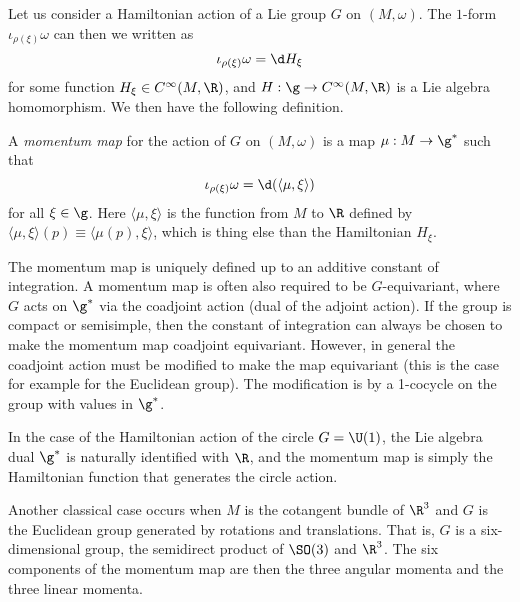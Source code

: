\documentclass{worksheetclass}
\begin{document}
        Let us consider a Hamiltonian action of a Lie group $G$ on $(M,\omega)$. The $1$-form $\iota_{\rho(\xi)}\omega$ can then we written as
        \begin{equation}
            \iota_{\rho(\xi)}\omega= \d H_{\xi}
        \end{equation}
        for some function $H_{\xi}\in C^\infty(M,\R)$, and $H:\g\to C^\infty(M,\R)$ is a Lie algebra homomorphism. We then have the following definition.
        \begin{defn}
            A \emph{momentum map} for the action of $G$ on $(M,\omega)$ is a map $\mu:M\to\g^*$ such that
            \begin{equation}
                \iota_{\rho(\xi)}\omega=\d(\langle \mu,\xi\rangle)
            \end{equation}
            for all $\xi\in\g$. Here $\langle \mu,\xi\rangle$ is the function from $M$ to $\R$ defined by $\langle \mu,\xi\rangle(p)\equiv\langle \mu(p),\xi\rangle$, which is thing else than the Hamiltonian $H_\xi$.
        \end{defn}
        The momentum map is uniquely defined up to an additive constant of integration. A momentum map is often also required to be $G$-equivariant, where $G$ acts on $\g^*$ via the coadjoint action (dual of the adjoint action). If the group is compact or semisimple, then the constant of integration can always be chosen to make the momentum map coadjoint equivariant. However, in general the coadjoint action must be modified to make the map equivariant (this is the case for example for the Euclidean group). The modification is by a 1-cocycle on the group with values in $\g^*$.

        \begin{examp}
            In the case of the Hamiltonian action of the circle $G=\U(1)$, the Lie algebra dual $\g^*$ is naturally identified with $\R$, and the momentum map is simply the Hamiltonian function that generates the circle action.
        \end{examp}

        \begin{examp}
            Another classical case occurs when $M$ is the cotangent bundle of $\R^{3}$ and $G$ is the Euclidean group generated by rotations and translations. That is, $G$ is a six-dimensional group, the semidirect product of $\SO(3)$ and $\R^{3}$. The six components of the momentum map are then the three angular momenta and the three linear momenta.
        \end{examp}
\end{document}
